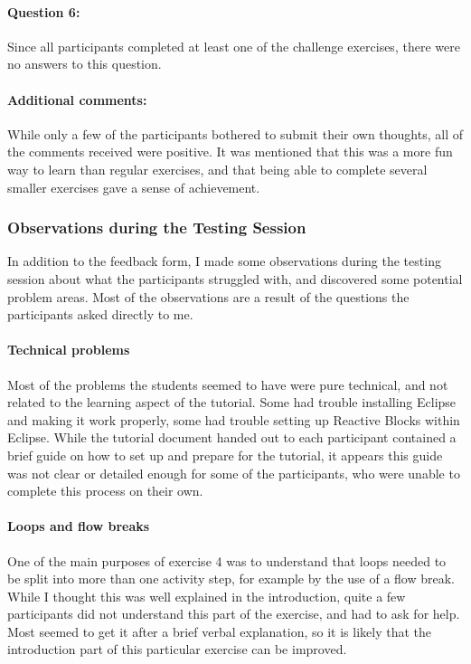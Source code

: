 \paragraph{Question 6:} Since all participants completed at least one of the challenge exercises, there were no answers to this question.

\paragraph{Additional comments:} While only a few of the participants bothered to submit their own thoughts, all of the comments received were positive. It was mentioned that this was a more fun way to learn than regular exercises, and that being able to complete several smaller exercises gave a sense of achievement.

\subsubsection{Observations during the Testing Session}
In addition to the feedback form, I made some observations during the testing session about what the participants struggled with, and discovered some potential problem areas. Most of the observations are a result of the questions the participants asked directly to me.

\paragraph{Technical problems} Most of the problems the students seemed to have were pure technical, and not related to the learning aspect of the tutorial. Some had trouble installing Eclipse and making it work properly, some had trouble setting up Reactive Blocks within Eclipse. While the tutorial document handed out to each participant contained a brief guide on how to set up and prepare for the tutorial, it appears this guide was not clear or detailed enough for some of the participants, who were unable to complete this process on their own.

\paragraph{Loops and flow breaks} One of the main purposes of exercise 4 was to understand that loops needed to be split into more than one activity step, for example by the use of a flow break. While I thought this was well explained in the introduction, quite a few participants did not understand this part of the exercise, and had to ask for help. Most seemed to get it after a brief verbal explanation, so it is likely that the introduction part of this particular exercise can be improved.


